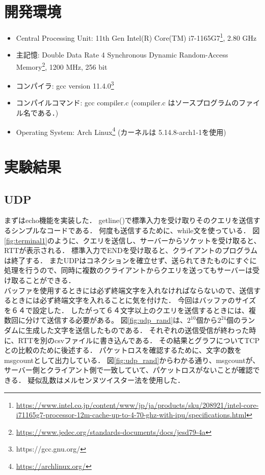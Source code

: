 \documentclass[fleqn, a4paper. 12pt]{ltjsarticle}
\begin{document}
    \section{開発環境}
    \begin{itemize}
      \item Central Processing Unit: 11th Gen Intel(R) Core(TM) i7-1165G7\footnote{\url{https://www.intel.co.jp/content/www/jp/ja/products/sku/208921/intel-core-i71165g7-processor-12m-cache-up-to-4-70-ghz-with-ipu/specifications.html}}, 2.80 GHz
      \item 主記憶: Double Data Rate 4 Synchronous Dynamic Random-Access Memory\footnote{\url{https://www.jedec.org/standards-documents/docs/jesd79-4a}}, 1200 MHz, 256 bit
      \item コンパイラ: gcc version 11.4.0\footnote{https://gcc.gnu.org/}
      \item コンパイルコマンド: gcc compiler.c (compiler.c はソースプログラムのファイル名である．)
      \item Operating System: Arch Linux\footnote{\url{https://archlinux.org/}} (カーネルは 5.14.8-arch1-1を使用)
  \end{itemize}


    \section{実験結果}
    \subsection{UDP}
    まずはecho機能を実装した．
    getline()で標準入力を受け取りそのクエリを送信するシンプルなコードである．
    何度も送信するために、while文を使っている．
    図\ref{fig:terminal1}のように、クエリを送信し、サーバーからソケットを受け取ると、RTTが表示される．
    標準入力でENDを受け取ると、クライアントのプログラムは終了する．
    またUDPはコネクションを確立せず、送られてきたものにすぐに処理を行うので、同時に複数のクライアントからクエリを送ってもサーバーは受け取ることができる．\\
    バッファを使用するときには必ず終端文字を入れなければならないので、送信するときには必ず終端文字を入れることに気を付けた．
    今回はバッファのサイズを６４で設定した．
    したがって６４文字以上のクエリを送信するときには、複数回に分けて送信する必要がある。
    図\ref{fig:udp_rand}は、$2^{10}$個から$2^{24}$個のランダムに生成した文字を送信したものである．
    それぞれの送信受信が終わった時に、RTTを別のcsvファイルに書き込んである．
    その結果とグラフについてTCPとの比較のために後述する．
    パケットロスを確認するために、文字の数をmsgcountとして出力している．
    図\ref{fig:udp_rand}からわかる通り、msgcountが、サーバー側とクライアント側で一致していて、パケットロスがないことが確認できる．
    疑似乱数はメルセンヌツイスター法を使用した．\\
\end{document}
